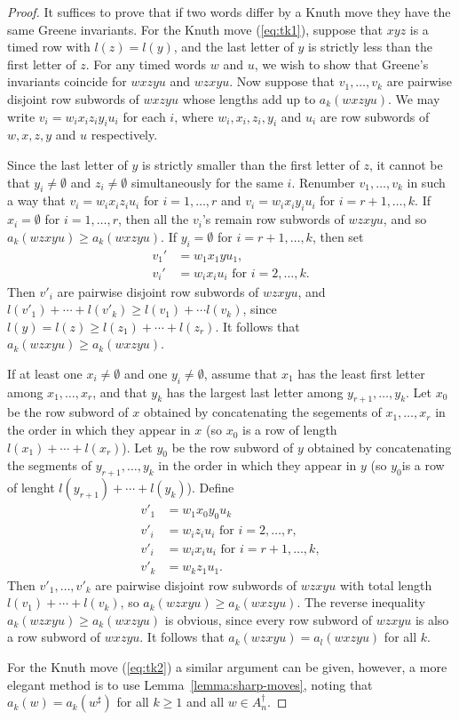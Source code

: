 \documentclass[10pt]{amsproc}
\theoremstyle{definition}
\theoremstyle{remark}
\begin{document}
\begin{proof}
  It suffices to prove that if two words differ by a Knuth move they have the same Greene invariants.
  For the Knuth move (\ref{eq:tk1}), suppose that $xyz$ is a timed row with $l(z)=l(y)$, and the last letter of $y$ is strictly less than the first letter of $z$.
  For any timed words $w$ and $u$, we wish to show that Greene's invariants coincide for $wxzyu$ and $wzxyu$.
  Now suppose that $v_1,\dotsc,v_k$ are pairwise disjoint row subwords of $wxzyu$ whose lengths add up to $a_k(wxzyu)$.
  We may write $v_i=w_ix_iz_iy_iu_i$ for each $i$, where $w_i,x_i,z_i,y_i$ and $u_i$ are row subwords of $w,x,z,y$ and $u$ respectively.

  Since the last letter of $y$ is strictly smaller than the first letter of $z$, it cannot be that $y_i\neq \emptyset$ and $z_i\neq \emptyset$ simultaneously for the same $i$.
  Renumber $v_1,\dotsc,v_k$ in such a way that $v_i=w_ix_iz_iu_i$ for $i=1,\dotsc,r$ and $v_i=w_ix_iy_iu_i$ for $i=r+1,\dotsc,k$.
  If $x_i=\emptyset$ for $i=1,\dotsc,r$, then all the $v_i$'s remain row subwords of $wzxyu$, and so $a_k(wzxyu)\geq a_k(wxzyu)$.
  If $y_i=\emptyset$ for $i=r+1,\dotsc,k$, then set
  \begin{align*}
    v_1'&=w_1x_1yu_1,\\
    v_i'&=w_ix_iu_i \text{ for } i=2,\dotsc,k.
  \end{align*}
  Then $v'_i$ are pairwise disjoint row subwords of $wzxyu$, and $l(v'_1)+\dotsb + l(v'_k)\geq l(v_1)+\dotsb l(v_k)$, since $l(y)=l(z)\geq l(z_1)+\dotsb + l(z_r)$.
  It follows that $a_k(wzxyu)\geq a_k(wxzyu)$.

  If at least one $x_i\neq \emptyset$ and one $y_i\neq\emptyset$, assume that $x_1$ has the least first letter among $x_1,\dotsc,x_r$, and that $y_k$ has the largest last letter among $y_{r+1},\dotsc,y_k$.
  Let $x_0$ be the row subword of $x$ obtained by concatenating the segements of $x_1,\dotsc,x_r$ in the order in which they appear in $x$ (so $x_0$ is a row of length $l(x_1)+\dotsb + l(x_r)$).
  Let $y_0$ be the row subword of $y$ obtained by concatenating the segments of $y_{r+1},\dotsc, y_k$ in the order in which they appear in $y$ (so $y_0$is a row of lenght $l(y_{r+1})+\dotsb + l(y_k)$).
  Define
  \begin{align*}
    v'_1 &= w_1x_0y_0u_k\\
    v'_i &= w_iz_iu_i \text{ for }i=2,\dotsc,r,\\
    v'_i &= w_ix_iu_i \text{ for } i=r+1,\dotsc,k,\\
    v'_k &= w_kz_1u_1.
  \end{align*}
  Then $v'_1,\dotsc,v'_k$ are pairwise disjoint row subwords of $wzxyu$ with total length $l(v_1)+\dotsb+l(v_k)$, so $a_k(wzxyu)\geq a_k(wxzyu)$.
  The reverse inequality $a_k(wzxyu)\geq a_k(wxzyu)$ is obvious, since every row subword of $wzxyu$ is also a row subword of $wxzyu$.
  It follows that $a_k(wzxyu)=a_l(wxzyu)$ for all $k$.

  For the Knuth move (\ref{eq:tk2}) a similar argument can be given, however, a more elegant method is to use Lemma~\ref{lemma:sharp-moves}, noting that $a_k(w)=a_k(w^\sharp)$ for all $k\geq 1$ and all $w\in A_n^\dagger$.
\end{proof}
\end{document}
